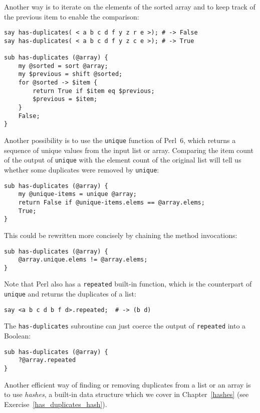 Another way is to iterate on the elements of the sorted 
array and to keep track of the previous item to enable 
the comparison:

\begin{verbatim}
say has-duplicates( < a b c d f y z r e >); # -> False
say has-duplicates( < a b c d f y z c e >); # -> True

sub has-duplicates (@array) {
    my @sorted = sort @array;
    my $previous = shift @sorted;
    for @sorted -> $item {
        return True if $item eq $previous;
        $previous = $item;
    }
    False;
}
\end{verbatim}
%

Another possibility is to use the {\tt unique} function 
of Perl~6, which returns a sequence of unique values 
from the input list or array. Comparing the item count 
of the output of {\tt unique} with the element count of 
the original list will tell us whether some duplicates were 
removed by {\tt unique}:

\begin{verbatim}
sub has-duplicates (@array) {
    my @unique-items = unique @array;
    return False if @unique-items.elems == @array.elems;
    True;
}
\end{verbatim}

This could be rewritten more concisely by chaining the 
method invocations:

\begin{verbatim}
sub has-duplicates (@array) {
    @array.unique.elems != @array.elems;
}
\end{verbatim}

Note that Perl also has a {\tt repeated} built-in 
function, which is the counterpart of {\tt unique} 
and returns the duplicates of a list:
\begin{verbatim}
say <a b c d b f d>.repeated;  # -> (b d)
\end{verbatim}

The {\tt has-duplicates} subroutine can just coerce 
the output of {\tt repeated} into a Boolean:
\begin{verbatim}
sub has-duplicates (@array) {
    ?@array.repeated
}
\end{verbatim}


Another efficient way of finding or removing duplicates 
from a list or an array is to use \emph{hashes}, a 
built-in data structure which we cover in 
Chapter~\ref{hashes} (see Exercise~\ref{has_duplicates_hash}).


